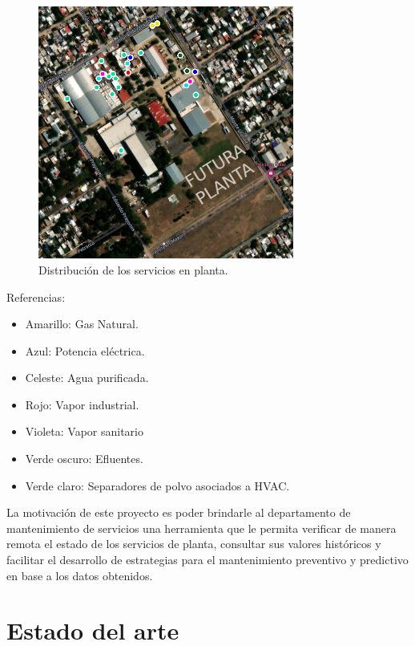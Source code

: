 \begin{figure}[htbp]
	\centering
	\includegraphics[width=0.75\textwidth]{./Figures/ROEMMERS2.png}
	\caption{Distribución de los servicios en planta.}
	\label{fig:LG}
\end{figure}
Referencias:
\begin{itemize}
	\item Amarillo: Gas Natural.
	\item Azul: Potencia eléctrica.
	\item Celeste: Agua purificada.
	\item Rojo: Vapor industrial.
	\item Violeta: Vapor sanitario
	\item Verde oscuro: Efluentes.
	\item Verde claro: Separadores de polvo asociados a HVAC.
\end{itemize}

La motivación de este proyecto es poder brindarle al departamento de mantenimiento de servicios una herramienta que le permita verificar de manera remota el estado de los servicios de planta, consultar sus valores históricos y facilitar el desarrollo de estrategias para el mantenimiento preventivo y predictivo en base a los datos obtenidos.%


\section{Estado del arte}

